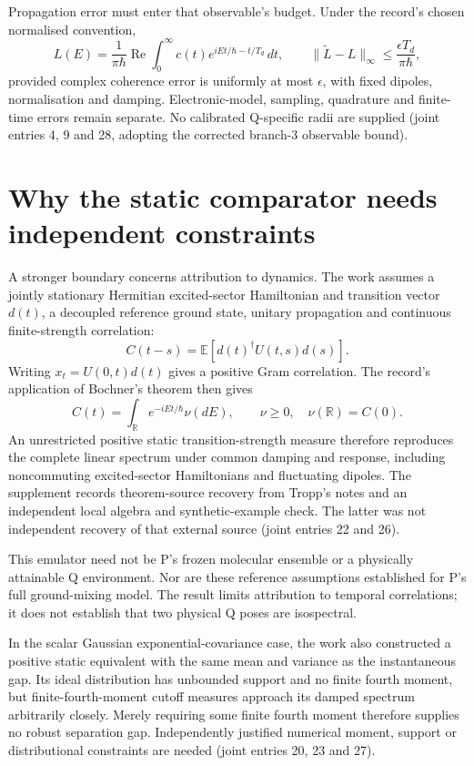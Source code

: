 \documentclass{article}
\begin{document}
Propagation error must enter that observable's budget. Under the record's chosen normalised convention,
\[
 L(E)=\frac{1}{\pi\hbar}\operatorname{Re}
 \int_0^\infty c(t)e^{iEt/\hbar-t/T_d}\,dt,
 \qquad
 \|\widetilde L-L\|_\infty\leq\frac{\epsilon T_d}{\pi\hbar},
\]
provided complex coherence error is uniformly at most \(\epsilon\), with fixed dipoles, normalisation and damping. Electronic-model, sampling, quadrature and finite-time errors remain separate. No calibrated Q-specific radii are supplied (joint entries 4, 9 and 28, adopting the corrected branch-3 observable bound).

\section{Why the static comparator needs independent constraints}

A stronger boundary concerns attribution to dynamics. The work assumes a jointly stationary Hermitian excited-sector Hamiltonian and transition vector \(d(t)\), a decoupled reference ground state, unitary propagation and continuous finite-strength correlation:
\[
 C(t-s)=\mathbb E[d(t)^\dagger U(t,s)d(s)].
\]
Writing \(x_t=U(0,t)d(t)\) gives a positive Gram correlation. The record's application of Bochner's theorem then gives
\[
 C(t)=\int_{\mathbb R}e^{-iEt/\hbar}\nu(dE),
 \qquad \nu\geq0,\quad \nu(\mathbb R)=C(0).
\]
An unrestricted positive static transition-strength measure therefore reproduces the complete linear spectrum under common damping and response, including noncommuting excited-sector Hamiltonians and fluctuating dipoles. The supplement records theorem-source recovery from Tropp's notes and an independent local algebra and synthetic-example check. The latter was not independent recovery of that external source (joint entries 22 and 26).

This emulator need not be P's frozen molecular ensemble or a physically attainable Q environment. Nor are these reference assumptions established for P's full ground-mixing model. The result limits attribution to temporal correlations; it does not establish that two physical Q poses are isospectral.

In the scalar Gaussian exponential-covariance case, the work also constructed a positive static equivalent with the same mean and variance as the instantaneous gap. Its ideal distribution has unbounded support and no finite fourth moment, but finite-fourth-moment cutoff measures approach its damped spectrum arbitrarily closely. Merely requiring some finite fourth moment therefore supplies no robust separation gap. Independently justified numerical moment, support or distributional constraints are needed (joint entries 20, 23 and 27).
\end{document}
